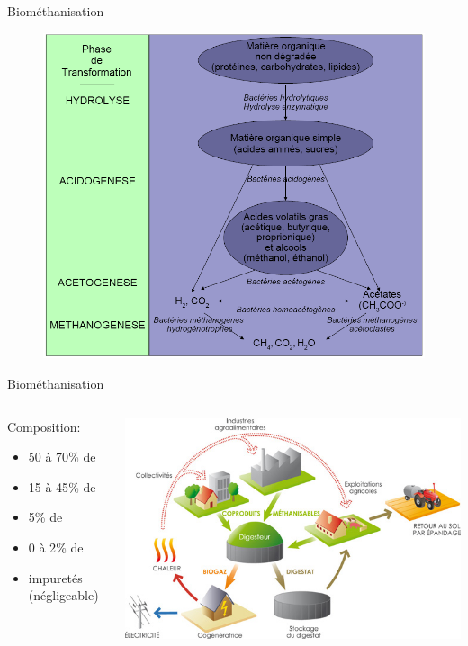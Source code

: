 \documentclass{beamer}
\begin{document}
\begin{frame}{Biométhanisation}
\begin{figure}
		\includegraphics[scale=0.3]{schema/process_biologique_methanisation_et_biogaz.png}
		\end{figure}
\end{frame}
 \begin{frame}{Biométhanisation}
	\begin{columns}
		
		\begin{column}{0.35\textwidth}
		Composition:
			\begin{itemize}
			\item 50 à \unit{70}{\%} de 
			\item 15 à \unit{45}{\%} de 
			\item  \unit{5}{\%} de 
			\item 0 à \unit{2}{\%} de 
			\item impuretés (négligeable)
			\end{itemize}
		\end{column}
		\begin{column}{0.50\textwidth}
		\includegraphics[scale=0.3]{schema/installationdebiomethanisation_Ledjo.jpg}
		\end{column}
	\end{columns}
\end{frame}
\end{document}

